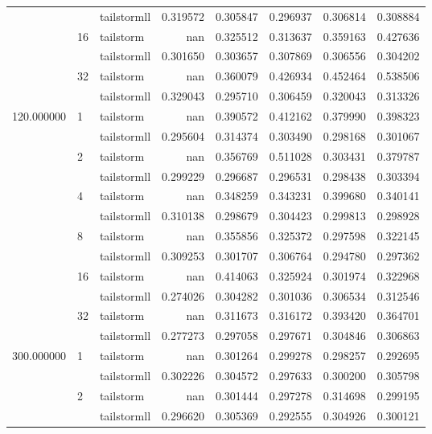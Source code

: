 \begin{tabular}{lllrrrrr}
 &  & tailstormll & 0.319572 & 0.305847 & 0.296937 & 0.306814 & 0.308884 \\
 & \multirow[c]{2}{*}{16} & tailstorm & nan & 0.325512 & 0.313637 & 0.359163 & 0.427636 \\
 &  & tailstormll & 0.301650 & 0.303657 & 0.307869 & 0.306556 & 0.304202 \\
 & \multirow[c]{2}{*}{32} & tailstorm & nan & 0.360079 & 0.426934 & 0.452464 & 0.538506 \\
 &  & tailstormll & 0.329043 & 0.295710 & 0.306459 & 0.320043 & 0.313326 \\
\multirow[c]{12}{*}{120.000000} & \multirow[c]{2}{*}{1} & tailstorm & nan & 0.390572 & 0.412162 & 0.379990 & 0.398323 \\
 &  & tailstormll & 0.295604 & 0.314374 & 0.303490 & 0.298168 & 0.301067 \\
 & \multirow[c]{2}{*}{2} & tailstorm & nan & 0.356769 & 0.511028 & 0.303431 & 0.379787 \\
 &  & tailstormll & 0.299229 & 0.296687 & 0.296531 & 0.298438 & 0.303394 \\
 & \multirow[c]{2}{*}{4} & tailstorm & nan & 0.348259 & 0.343231 & 0.399680 & 0.340141 \\
 &  & tailstormll & 0.310138 & 0.298679 & 0.304423 & 0.299813 & 0.298928 \\
 & \multirow[c]{2}{*}{8} & tailstorm & nan & 0.355856 & 0.325372 & 0.297598 & 0.322145 \\
 &  & tailstormll & 0.309253 & 0.301707 & 0.306764 & 0.294780 & 0.297362 \\
 & \multirow[c]{2}{*}{16} & tailstorm & nan & 0.414063 & 0.325924 & 0.301974 & 0.322968 \\
 &  & tailstormll & 0.274026 & 0.304282 & 0.301036 & 0.306534 & 0.312546 \\
 & \multirow[c]{2}{*}{32} & tailstorm & nan & 0.311673 & 0.316172 & 0.393420 & 0.364701 \\
 &  & tailstormll & 0.277273 & 0.297058 & 0.297671 & 0.304846 & 0.306863 \\
\multirow[c]{12}{*}{300.000000} & \multirow[c]{2}{*}{1} & tailstorm & nan & 0.301264 & 0.299278 & 0.298257 & 0.292695 \\
 &  & tailstormll & 0.302226 & 0.304572 & 0.297633 & 0.300200 & 0.305798 \\
 & \multirow[c]{2}{*}{2} & tailstorm & nan & 0.301444 & 0.297278 & 0.314698 & 0.299195 \\
 &  & tailstormll & 0.296620 & 0.305369 & 0.292555 & 0.304926 & 0.300121 \\

\end{tabular}
